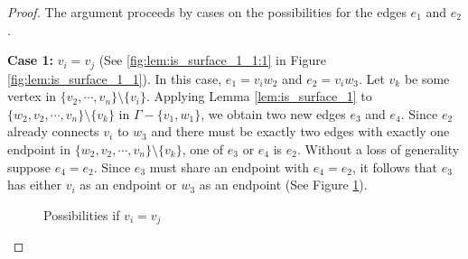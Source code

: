 \begin{proof}
    The argument proceeds by cases on the possibilities for the edges \(e_1\) and \(e_2\).
    
    \textbf{Case 1:} \(v_i = v_j\) (See \ref{fig:lem:is_surface_1_1:1} in Figure \ref{fig:lem:is_surface_1_1}). 
    In this case, \(e_1 = v_i w_2\) and \(e_2 = v_i w_3\). 
    Let \(v_k\) be some vertex in \(\{v_2, \cdots, v_n\}\setminus\{v_i\}\).
    Applying Lemma \ref{lem:is_surface_1} to \(\{w_2, v_2, \cdots, v_n\}\setminus\{v_k\}\) in \(\Gamma - \{v_1, w_1\}\),
    we obtain two new edges \(e_3\) and \(e_4\).
    Since \(e_2\) already connects \(v_i\) to \(w_3\) and there must be exactly two edges
    with exactly one endpoint in \(\{w_2, v_2, \cdots, v_n\}\setminus\{v_k\}\),
    one of \(e_3\) or \(e_4\) is \(e_2\). 
    Without a loss of generality suppose \(e_4 = e_2\).
    Since \(e_3\) must share an endpoint with \(e_4 = e_2\), it follows that \(e_3\) has either \(v_i\) as an endpoint or \(w_3\) as an endpoint (See Figure \ref{fig:lem:is_surface_2_0}).
    \begin{figure}[h!]
        \centering
        \quad\quad
        \caption{Possibilities if \(v_i = v_j\)}
        \label{fig:lem:is_surface_2_0}
    \end{figure}


\end{proof}
